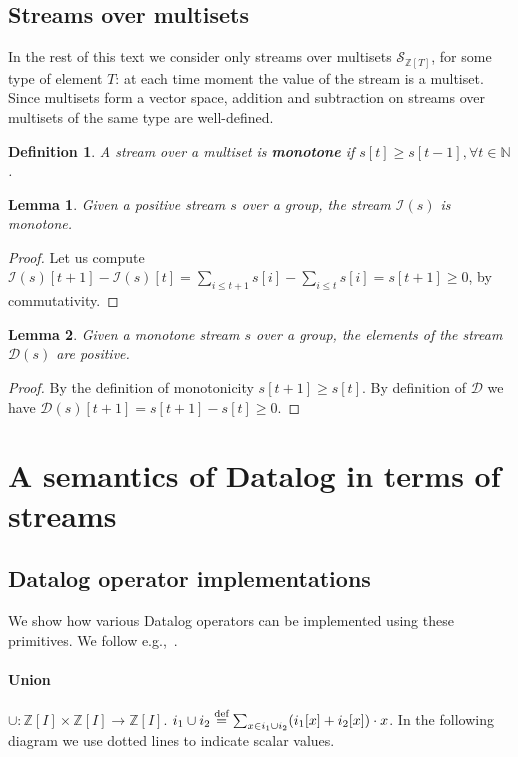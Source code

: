 \documentclass[10pt]{article}
\newtheorem{lemma}{Lemma}[section]
\newtheorem{definition}{Definition}[section]
\newcommand{\Z}{\mathbb{Z}}  %
\newcommand{\N}{\mathbb{N}}  %
\newcommand{\stream}[1]{\ensuremath{\mathcal{S}_{#1}}}
\newcommand{\I}{\mathcal{I}}  %
\newcommand{\D}{\mathcal{D}}  %
\newcommand{\defn}{\stackrel{\textrm{\scriptsize def}}{=}}
\begin{document}
\subsection{Streams over multisets}

In the rest of this text we consider only streams over multisets
$\stream{\Z[T]}$, for some type of element $T$: at each time moment
the value of the stream is a multiset.  Since multisets form a vector
space, addition and subtraction on streams over multisets of the same
type are well-defined.

\begin{definition}
A stream over a multiset is \textbf{monotone} if $s[t] \geq s[t-1],
\forall t \in \N$.
\end{definition}

\begin{lemma}
Given a positive stream $s$ over a group, the stream $\I(s)$ is
monotone.
\end{lemma}
\begin{proof}
  Let us compute $\I(s)[t + 1] - \I(s)[t] = \sum_{i \leq t+1}s[i] -
  \sum_{i \leq t}s[i] = s[t+1] \geq 0$, by commutativity.
\end{proof}

\begin{lemma}
Given a monotone stream $s$ over a group, the elements of the stream
$\D(s)$ are positive.
\end{lemma}
\begin{proof}
  By the definition of monotonicity $s[t+1] \geq s[t]$.  By definition
  of $\D$ we have $\D(s)[t+1] = s[t+1] - s[t] \geq 0$.
\end{proof}

\section{A semantics of Datalog in terms of streams}

\subsection{Datalog operator implementations}

We show how various Datalog operators can be implemented using these
primitives.  We follow e.g.,~\cite{green-pods07}.

\paragraph{Union} $\cup: \Z[I] \times \Z[I] \rightarrow \Z[I]$.  $i_1
\cup i_2 \defn \sum_{x \in i_1 \cup i_2} (i_1[x] + i_2[x]) \cdot x$.
In the following diagram we use dotted lines to indicate scalar
values.
\end{document}
